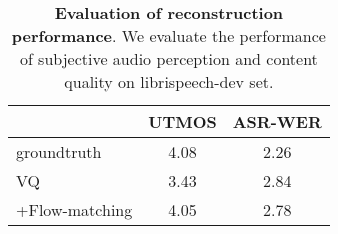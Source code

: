 \begin{table}[h]
    \caption{\textbf{Evaluation of reconstruction performance}. We evaluate the performance of subjective audio perception and content quality on librispeech-dev set.}
    \label{tab:fm-audio-data-summary}
\centering
\begin{tabular}{@{}lcc@{}}
\toprule
               & UTMOS\footnotemark[2] & ASR-WER \\ \midrule
groundtruth    & 4.08  & 2.26    \\
VQ             & 3.43  & 2.84    \\
+Flow-matching & 4.05  & 2.78    \\ \bottomrule
\end{tabular}
\end{table}

